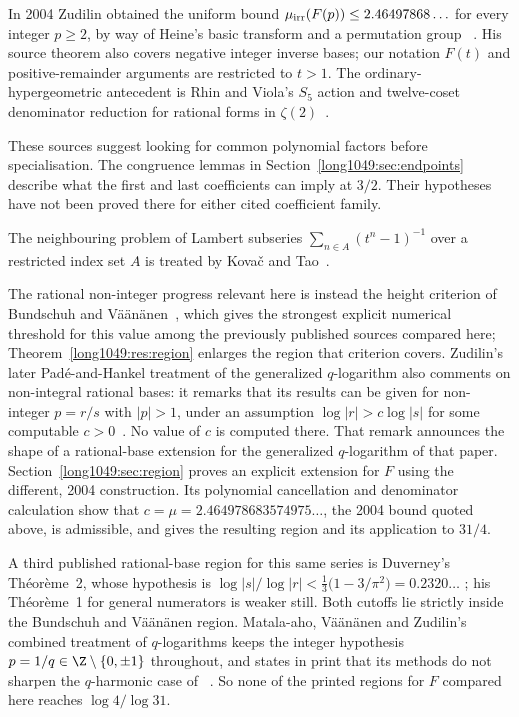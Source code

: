 In 2004 Zudilin obtained the uniform bound
$\mu_{\rm irr}(F(p))\le2.46497868\ldots$ for every integer $p\ge2$,
by way of Heine's basic transform and a permutation group
~\cite[Thm.~1, p.~154; Secs.~4--5, pp.~159--162]{zudilin2004}.
His source theorem also covers negative integer inverse bases; our
notation $F(t)$ and positive-remainder arguments are restricted to $t>1$.
The ordinary-hypergeometric antecedent is Rhin and Viola's $S_5$ action and
twelve-coset denominator reduction for rational forms in
$\zeta(2)$~\cite[Sec.~3, pp.~38--42; Sec.~4, pp.~46--51]{rhinviola1996}.

These sources suggest looking for common polynomial factors before
specialisation. The congruence lemmas in
Section~\ref{long1049:sec:endpoints} describe what the first and last
coefficients can imply at $3/2$. Their hypotheses have not been proved
there for either cited coefficient family.

The neighbouring problem of Lambert
subseries $\sum_{n\in A}(t^{n}-1)^{-1}$ over a restricted index set $A$ is
treated by Kova\v{c} and Tao~\cite[Sec.~2.1.2 and Thm.~2.3, pp.~4--5]{kovactao2024}.

The rational non-integer
progress relevant here is instead the height criterion of Bundschuh and
V\"a\"an\"anen~\cite[Thm.~2, p.~177]{bv1994}, which gives the strongest explicit
numerical threshold for this value among the previously published sources
compared here; Theorem~\ref{long1049:res:region} enlarges the region that
criterion covers.  Zudilin's later Pad\'e-and-Hankel treatment of the generalized
$q$-logarithm also comments on non-integral rational bases: it remarks that its results can be
given for non-integer $p=r/s$ with $|p|>1$, under an assumption
$\log|r|>c\log|s|$ for some computable
$c>0$~\cite[Sec.~2, p.~4]{zudilin2016}.  No value of $c$ is computed there.  That remark
announces the shape of a rational-base extension for the generalized
$q$-logarithm of that paper.  Section~\ref{long1049:sec:region} proves an explicit extension for
$F$ using the different, 2004 construction. Its polynomial cancellation
and denominator calculation show that
$c=\mu=2.464978683574975\ldots$, the 2004 bound quoted above, is admissible,
and gives the resulting region and its application to $31/4$.

A third published rational-base region for this same series is Duverney's
Th\'eor\`eme~2, whose hypothesis is
$\log|s|/\log|r|<\frac13\bigl(1-3/\pi^{2}\bigr)=0.2320\ldots$
\cite[Th\'eor\`eme~2, p.~174]{duverney1996}; his Th\'eor\`eme~1 for general
numerators is weaker still.  Both cutoffs lie strictly inside the Bundschuh and
V\"a\"an\"anen region.  Matala-aho, V\"a\"an\"anen and Zudilin's combined
treatment of $q$-logarithms keeps the integer hypothesis $p=1/q\in\Z\mathbin{\backslash}\{0,\pm1\}$
throughout, and states in print that its methods do not sharpen the
$q$-harmonic case of~\cite{zudilin2004}
\cite[abstract p.~879; introduction p.~880]{matalaaho2006}.  So none of the
printed regions for $F$ compared here reaches $\log4/\log31$.


